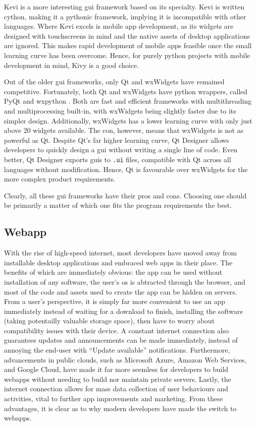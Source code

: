 \documentclass[11pt]{article}
\begin{document}
Kevi is a more interesting \acrshort{gui} \gls{framework} based on its specialty. Kevi is written \Gls{cython}, making it a \Gls{python}ic \gls{framework}, implying it is incompatible with other languages. Where Kevi excels is mobile app development, as its widgets are designed with touchscreens in mind and the native assets of desktop applications are ignored. This makes rapid development of mobile apps feasible once the small learning curve has been overcome. Hence, for purely \Gls{python} projects with mobile development in mind, Kivy is a good choice.

Out of the older \acrshort{gui} \glspl{framework}, only Qt and wxWidgets have remained competitive. Fortunately, both Qt and wxWidgets have \Gls{python} wrappers, called PyQt and wx\Gls{python} \cite{pyqt} \cite{wxpython}. Both are fast and efficient \glspl{framework} with multithreading and multiprocessing built-in, with wxWidgets being slightly faster due to its simpler design. Additionally, wxWidgets has a lower learning curve with only just above 20 widgets available. The con, however, means that wxWidgets is not as powerful as Qt. Despite Qt's far higher learning curve, Qt Designer allows developers to quickly design a \acrshort{gui} without writing a single line of code. Even better, Qt Designer exports \acrshort{gui}s to \texttt{.ui} files, compatible with Qt across all languages without modification. Hence, Qt is favourable over wxWidgets for the more complex product requirements.

Clearly, all these \acrshort{gui} \glspl{framework} have their pros and cons. Choosing one should be primarily a matter of which one fits the program requirements the best.

\subsection{Webapp}

With the rise of high-speed internet, most developers have moved away from installable desktop applications and embraced web apps in their place. The benefits of which are immediately obvious: the app can be used without installation of any software, the \gls{user}'s \acrshort{os} is abtracted through the \gls{browser}, and most of the code and assets used to create the app can be hidden on \gls{server}s. From a \gls{user}'s perspective, it is simply far more convenient to use an app immediately instead of waiting for a download to finish, installing the software (taking potentailly valuable storage space), then have to worry about compatibility issues with their device. A constant internet connection also guarantees updates and announcements can be made immediately, instead of annoying the end-user with ``Update available'' notifications. Furthermore, advancements in public clouds, such as Microsoft Azure, Amazon Web Services, and Google Cloud, have made it far more seemless for developers to build \gls{webapp}s without needing to build nor maintain private \gls{server}s. Lastly, the internet connection allows for mass data collection of user behaviours and activities, vital to further app improvements and marketing. From these advantages, it is clear as to why modern developers have made the switch to \gls{webapp}s.
\end{document}
